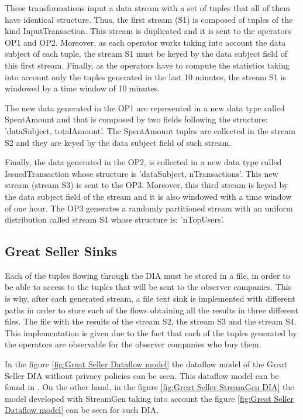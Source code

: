 These transformations input a data stream with a set of tuples that all of them have identical structure. Thus, the first stream (S1) is composed of tuples of the kind InputTransaction. This stream is duplicated and it is sent to the operators OP1 and OP2. Moreover, as each operator works taking into account the data subject of each tuple, the stream S1 must be keyed by the data subject field of this first stream. Finally, as the operators have to compute the statistics taking into account only the tuples generated in the last 10 minutes, the stream S1 is windowed by a time window of 10 minutes.

The new data generated in the OP1 are represented in a new data type called SpentAmount and that is composed by two fields following the structure: 'dataSubject, totalAmount'. The SpentAmount tuples are collected in the stream S2 and they are keyed by the data subject field of such stream.

Finally, the data generated in the OP2, is collected in a new data type called IssuedTransaction whose structure is 'dataSubject, nTransactions'. This new stream (stream S3) is sent to the OP3. Moreover, this third stream is keyed by the data subject field of the stream and it is also windowed with a time window of one hour. The OP3 generates a randomly partitioned stream with an uniform distribution called stream S4 whose structure is: 'nTopUsers'.

\subsection{Great Seller Sinks}
Each of the tuples flowing through the DIA must be stored in a file, in order to be able to access to the tuples that will be sent to the observer companies. This is why, after each generated stream, a file text sink is implemented with different paths in order to store each of the flows obtaining all the results in three different files. The file with the results of the stream S2, the stream S3 and the stream S4.
This implementation is given due to the fact that each of the tuples generated by the operators are observable for the observer companies who buy them.

In the figure \ref{fig:Great Seller Dataflow model} the dataflow model of the Great Seller DIA without privacy policies can be seen. This dataflow model can be found in \cite{privacypoliciesarticle}. On the other hand, in the figure \ref{fig:Great Seller StreamGen DIA} the model developed with StreamGen taking into account the figure \ref{fig:Great Seller Dataflow model} can be seen for such DIA.

